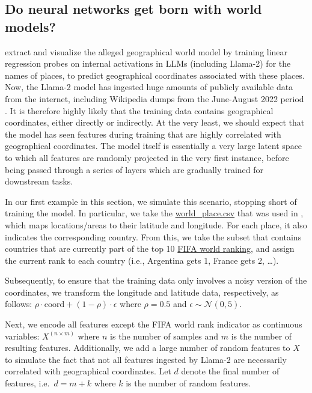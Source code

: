 \documentclass{article}
\theoremstyle{plain}
\theoremstyle{definition}
\theoremstyle{remark}
\begin{document}
\subsection{Do neural networks get born with world models?}\label{example-deep-learning}

\citet{gurnee2023languagev2} extract and visualize the alleged geographical world model by training linear regression probes on internal activations in LLMs (including Llama-2) for the names of places, to predict geographical coordinates associated with these places. Now, the Llama-2 model has ingested huge amounts of publicly available data from the internet, including Wikipedia dumps from the June-August 2022 period \citep{touvron2023llama}. It is therefore highly likely that the training data contains geographical coordinates, either directly or indirectly. At the very least, we should expect that the model has seen features during training that are highly correlated with geographical coordinates. The model itself is essentially a very large latent space to which all features are randomly projected in the very first instance, before being passed through a series of layers which are gradually trained for downstream tasks.

In our first example in this section, we simulate this scenario, stopping short of training the model. In particular, we take the \href{https://github.com/wesg52/world-models/blob/main/data/entity_datasets/world_place.csv}{world\_place.csv} that was used in \citet{gurnee2023languagev2}, which maps locations/areas to their latitude and longitude. For each place, it also indicates the corresponding country. From this, we take the subset that contains countries that are currently part of the top 10 \href{https://www.fifa.com/fifa-world-ranking/men?dateId=id14142}{FIFA world ranking}, and assign the current rank to each country (i.e., Argentina gets 1, France gets 2, \ldots{}).

Subsequently, to ensure that the training data only involves a noisy version of the coordinates, we transform the longitude and latitude data, respectively, as follows: \(\rho \cdot \text{coord} + (1-\rho) \cdot \epsilon\) where \(\rho=0.5\) and \(\epsilon \sim \mathcal{N}(0, 5)\).

Next, we encode all features except the FIFA world rank indicator as continuous variables: \(X^{(n \times m)}\) where \(n\) is the number of samples and \(m\) is the number of resulting features. Additionally, we add a large number of random features to \(X\) to simulate the fact that not all features ingested by Llama-2 are necessarily correlated with geographical coordinates. Let \(d\) denote the final number of features, i.e.~\(d=m+k\) where \(k\) is the number of random features.
\end{document}

